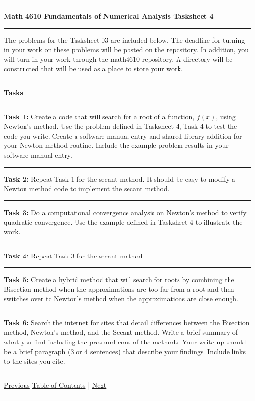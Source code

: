 \documentclass[10pt,fleqn]{article}
\begin{document}
\vskip0.1in\hrule\vskip0.1in \noindent
{\bf{\Large Math 4610 Fundamentals of Numerical Analysis Tasksheet 4}}
\vskip0.1in\hrule\vskip0.1in \noindent
The problems for the Tasksheet 03 are included below. The deadline for turning
in your work on these problems will be posted on the repository. In addition,
you will turn in your work through the math4610 repository. A directory will be
constructed that will be used as a place to store your work.
\vskip0.1in\hrule\vskip0.1in \noindent
{\bf{\large Tasks}}
\vskip0.1in\hrule\vskip0.1in \noindent
\begin{trivlist}
  \item[\bf Task 1:]
    Create a code that will search for a root of a function, \(f(x)\), using
    Newton's method. Use the problem defined in Tasksheet 4, Task 4 to test the
    code you write. Create a software manual entry and shared library addition
    for your Newton method routine. Include the example problem results in your
    software manual entry.
\vskip0.1in\hrule\vskip0.1in \noindent
  \item[\bf Task 2:] Repeat Task 1 for the secant method. It should be easy to
    modify a Newton method code to implement the secant method.
\vskip0.1in\hrule\vskip0.1in \noindent
  \item[\bf Task 3:] Do a computational convergence analysis on Newton's method
    to verify quadratic convergence. Use the example defined in Tasksheet 4 to
    illustrate the work. 
\vskip0.1in\hrule\vskip0.1in \noindent
  \item[\bf Task 4:] Repeat Task 3 for the secant method.
\vskip0.1in\hrule\vskip0.1in \noindent
  \item[\bf Task 5:] Create a hybrid method that will search for roots by
    combining the Bisection method when the approximations are too far from a
    root and then switches over to Newton's method when the approximations are
    close enough.
\vskip0.1in\hrule\vskip0.1in \noindent
  \item[\bf Task 6:] Search the internet for sites that detail differences
    between the Bisection method, Newton's method, and the Secant method. Write
    a brief summary of what you find including the pros and cons of the methods.
    Your write up should be a brief paragraph (3 or 4 sentences) that describe
    your findings. Include links to the sites you cite.
\end{trivlist}
\vskip0.1in\hrule\vskip0.1in \noindent
  \href{../../tasksheet_04/html/tasksheet_04.html}{Previous}
  \href{../../toc/md/tasksheet_toc.md}{Table of Contents} |
  \href{../../tasksheet_06/html/tasksheet_06.html}{Next}
\vskip0.1in\hrule\vskip0.1in \noindent
\end{document}
